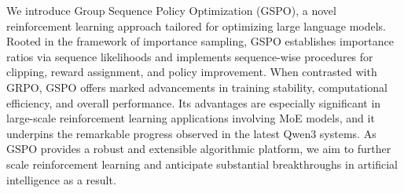 We introduce Group Sequence Policy Optimization (GSPO), a novel reinforcement learning approach tailored for optimizing large language models. Rooted in the framework of importance sampling, GSPO establishes importance ratios via sequence likelihoods and implements sequence-wise procedures for clipping, reward assignment, and policy improvement. When contrasted with GRPO, GSPO offers marked advancements in training stability, computational efficiency, and overall performance. Its advantages are especially significant in large-scale reinforcement learning applications involving MoE models, and it underpins the remarkable progress observed in the latest Qwen3 systems. As GSPO provides a robust and extensible algorithmic platform, we aim to further scale reinforcement learning and anticipate substantial breakthroughs in artificial intelligence as a result.

